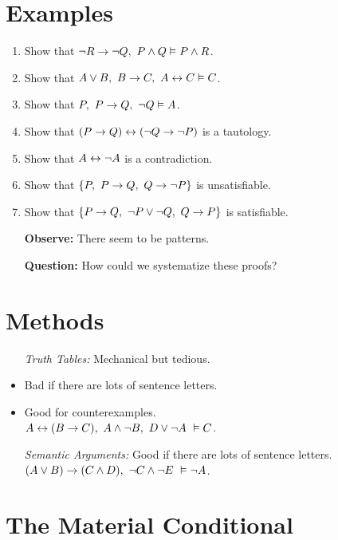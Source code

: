 \documentclass[a4paper, 11pt]{article} %
\begin{document}
\section*{Examples}

\begin{enumerate}
  \item Show that $\neg R \rightarrow \neg Q,\ P \wedge Q \vDash P \wedge R$.
  \item Show that $A \vee B,\ B \rightarrow C,\ A \leftrightarrow C \vDash C$.
  \item Show that $P,\ P \rightarrow Q,\ \neg Q \vDash A$.
  \item Show that $(P \rightarrow Q) \leftrightarrow (\neg Q \rightarrow \neg P)$ is a tautology.
  \item Show that $A \leftrightarrow \neg A$ is a contradiction.
  \item Show that $\{P,\ P \rightarrow Q,\ Q \rightarrow \neg P\}$ is unsatisfiable. 
  \item Show that $\lbrace P \rightarrow Q,\ \neg P \vee \neg Q,\ Q \rightarrow P\rbrace$ is satisfiable.
  \item[\bf Observe:] There seem to be patterns.
  \item[\bf Question:] How could we systematize these proofs?
\end{enumerate}




\section*{Methods}

\begin{itemize}[leftmargin=1.2in,labelsep=.15in] %
  \item[\it Truth Tables:] Mechanical but tedious.
    \item Bad if there are lots of sentence letters.
    \item Good for counterexamples.\\
      $A \leftrightarrow (B \rightarrow C),\ A \wedge \neg B,\ D \vee \neg A\ \vDash C$.
  \item[\it Semantic Arguments:] Good if there are lots of sentence letters.\\
        $(A \vee B) \rightarrow (C \wedge D),\ \neg C \wedge \neg E\ \vDash \neg A$.
\end{itemize}




\section*{The Material Conditional}
\end{document}
